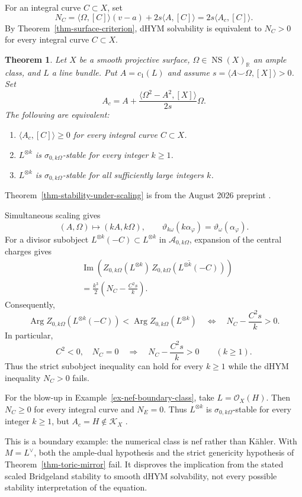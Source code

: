 \documentclass[12pt,reqno]{amsart}
\numberwithin{equation}{section}
\theoremstyle{plain}
\newcommand{\recallheading}{Theorem}
\newtheorem*{recalledtheorem}{\recallheading}
\newenvironment{theoremrecall}[1]{%
 \renewcommand{\recallheading}{Theorem~\ref{#1} (recalled)}%
 \begin{recalledtheorem}%
}{\end{recalledtheorem}}
\theoremstyle{definition}
\newcommand{\cK}{\mathcal K}
\newcommand{\R}{\mathbb R}
\DeclareMathOperator{\NS}{NS}
\newcommand{\SurfaceStabilityStatement}{%
Let $X$ be a smooth projective surface, $\Omega\in\NS(X)_\R$ an ample
class, and $L$ a line bundle. Put $A=c_1(L)$ and assume
$s=\langle A\smile\Omega,[X]\rangle>0$. Set
\[
 A_c=A+\frac{\langle\Omega^2-A^2,[X]\rangle}{2s}\Omega.
\]
The following are equivalent:
\begin{enumerate}
\item $\langle A_c,[C]\rangle\geq0$ for every integral curve $C\subset X$.
\item $L^{\otimes k}$ is $\sigma_{0,k\Omega}$-stable for every integer $k\geq1$.
\item $L^{\otimes k}$ is $\sigma_{0,k\Omega}$-stable for all sufficiently
large integers $k$.
\end{enumerate}
}
\begin{document}
For an integral curve $C\subset X$, set
\begin{equation}\label{curve-invariant}
 N_C=\langle\Omega,[C]\rangle(v-a)+2s\langle A,[C]\rangle
     =2s\langle A_c,[C]\rangle.
\end{equation}
By Theorem~\ref{thm-surface-criterion}, dHYM solvability is equivalent
to $N_C>0$ for every integral curve $C\subset X$.

\begin{theoremrecall}{thm-stability-under-scaling}
\SurfaceStabilityStatement
\end{theoremrecall}

Theorem~\ref{thm-stability-under-scaling} is from the August 2026
preprint \cite{Mak26}.

Simultaneous scaling gives
\[
 (A,\Omega)\longmapsto(kA,k\Omega),\qquad
 \vartheta_{k\omega}(k\alpha_\varphi)=\vartheta_\omega(\alpha_\varphi).
\]
For a divisor subobject $L^{\otimes k}(-C)\subset L^{\otimes k}$ in
$\mathcal A_{0,k\Omega}$, expansion of the central charges gives
\begin{align*}
 &\operatorname{Im}\left(
 Z_{0,k\Omega}(L^{\otimes k})\,
 \overline{Z_{0,k\Omega}(L^{\otimes k}(-C))}\right)\\
 &=\frac{k^3}{2}\left(N_C-\frac{C^2s}{k}\right).
\end{align*}
Consequently,
\[
 \operatorname{Arg}Z_{0,k\Omega}(L^{\otimes k}(-C))
 <\operatorname{Arg}Z_{0,k\Omega}(L^{\otimes k})
 \quad\Longleftrightarrow\quad N_C-\frac{C^2s}{k}>0.
\]
In particular,
\[
 C^2<0,\quad N_C=0
 \quad\Longrightarrow\quad
 N_C-\frac{C^2s}{k}>0\qquad(k\geq1).
\]
Thus the strict subobject inequality can hold for every $k\geq1$
while the dHYM inequality $N_C>0$ fails.

For the blow-up in Example~\ref{ex-nef-boundary-class}, take
$L=\mathcal O_X(H)$. Then $N_C\geq0$ for every integral curve and
$N_E=0$. Thus $L^{\otimes k}$ is
$\sigma_{0,k\Omega}$-stable for every integer $k\geq1$, but
$A_c=H\notin\cK_X$ \cite[Example 2.11]{Fan26}.

This is a boundary example: the numerical class is nef rather than
K\"ahler. With $M=L^\vee$, both the ample-dual hypothesis and the strict
genericity hypothesis of Theorem~\ref{thm-toric-mirror} fail.
It disproves the implication from the stated scaled Bridgeland
stability to smooth dHYM solvability, not every possible stability
interpretation of the equation.
\end{document}
